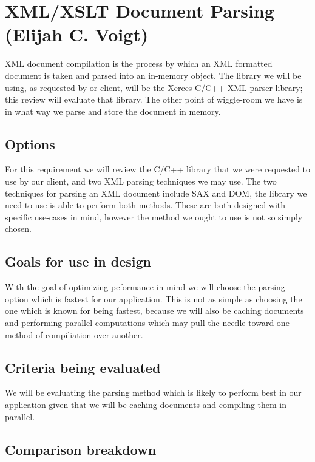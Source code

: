\section{XML/XSLT Document Parsing (Elijah C. Voigt)}

XML document compilation is the process by which an XML formatted document is taken and parsed into an in-memory object.
The library we will be using, as requested by or client, will be the Xerces-C/C++ XML parser library; this review will evaluate that library.
The other point of wiggle-room we have is in what way we parse and store the document in memory.

\subsection{Options}

For this requirement we will review the C/C++ library that we were requested to use by our client, and two XML parsing techniques we may use.
The two techniques for parsing an XML document include SAX and DOM, the library we need to use is able to perform both methods.
These are both designed with specific use-cases in mind, however the method we ought to use is not so simply chosen.

\subsection{Goals for use in design}

With the goal of optimizing peformance in mind we will choose the parsing option which is fastest for our application.
This is not as simple as choosing the one which is known for being fastest, because we will also be caching documents and performing parallel computations which may pull the needle toward one method of compiliation over another.

\subsection{Criteria being evaluated}

We will be evaluating the parsing method which is likely to perform best in our application given that we will be caching documents and compiling them in parallel.

\subsection{Comparison breakdown}

